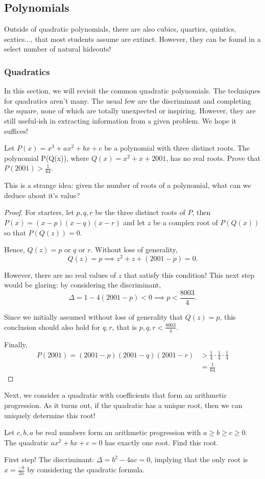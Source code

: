 \documentclass[../jarvis.tex]{subfiles}
\begin{document}
\subsection{Polynomials \med}
Outside of quadratic polynomials, there are also cubics, quartics, quintics, sextics..., that most students assume are extinct. However, they can be found in a select number of natural hideouts!

\subsubsection{Quadratics}
In this section, we will revisit the common quadratic polynomials.
The techniques for quadratics aren't many. The usual few are the discriminant and completing the square, none of which are totally unexpected or inspiring. However, they are still useful-ish in extracting information from a given problem. We hope it suffices!
\begin{example}[2010-2011 Mandelbrot]
    Let $P(x)=x^3+ax^2+bx+c$ be a polynomial with three distinct roots. The polynomial P(Q(x)), where $Q(x)=x^2+x+2001$, has no real roots. Prove that $P(2001)>\frac{1}{64}$.
\end{example}
This is a strange idea: given the number of roots of a polynomial, what can we deduce about it's value?

\begin{proof}
    For starters, let $p,q,r$ be the three distinct roots of $P$, then $P(x)=(x-p)(x-q)(x-r)$ and let $z$ be a complex root of $P(Q(x))$ so that $P(Q(z))=0$. 

Hence, $Q(z)=\text{$p$ or $q$ or $r$}$. Without loss of generality, $$Q(z)=p \implies z^2+z+(2001-p)=0.$$

However, there are no real values of $z$ that satisfy this condition! This next step would be glaring: by considering the discriminant,
$$\Delta=1-4(2001-p) < 0 \implies p < \frac{8003}{4}.$$

Since we initially assumed without loss of generality that $Q(z)=p$, this conclusion should also hold for $q, r$, that is $p,q,r < \frac{8003}{4}$.

Finally, \begin{align*}
    P(2001)=(2001-p)(2001-q)(2001-r) &> \frac{1}{4}\cdot\frac{1}{4}\cdot\frac{1}{4} \\
    &=\frac{1}{64}
\end{align*}
\end{proof}
Next, we consider a quadratic with coefficients that form an arithmetic progression. As it turns out, if the quadratic has a unique root, then we can uniquely determine this root!
\begin{example}[2013 AMC 10B P19]
    Let $c,b,a$ be real numbers form an arithmetic progression with $a\geq b\geq c\geq 0$. The quadratic $ax^2+bx+c=0$ has exactly one root. Find this root.
\end{example}
First step! The discriminant: $\Delta=b^2-4ac=0$, implying that the only root is $x=\frac{-b}{2a}$ by considering the quadratic formula.
\end{document}
